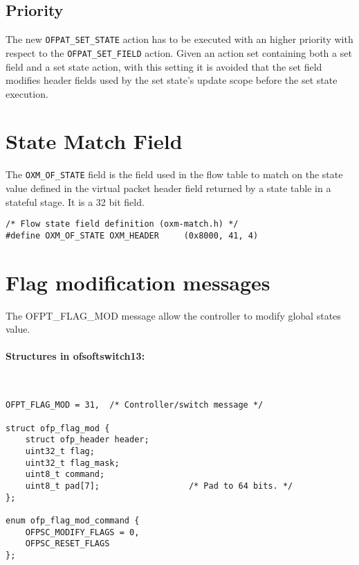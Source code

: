 \subsection{Priority}

The new \texttt{OFPAT\_SET\_STATE} action has to be executed with an higher priority with respect to the \texttt{OFPAT\_SET\_FIELD} action. Given an action set containing both a set field and a set state action, with this setting it is avoided that the set field modifies header fields used by the set state's update scope before the set state execution.


\section{State Match Field}
\label{sec:match_state}

The \texttt{OXM\_OF\_STATE} field is the field used in the flow table to match on the state value defined in the virtual packet header field returned by a state table in a stateful stage. It is a 32 bit field.


\begin{verbatim}
/* Flow state field definition (oxm-match.h) */
#define OXM_OF_STATE OXM_HEADER     (0x8000, 41, 4)
\end{verbatim}

\section{Flag modification messages}
\label{section:flag_mod_msg}
The OFPT\_FLAG\_MOD message allow the controller to modify global states value.
\paragraph{Structures in ofsoftswitch13:}\mbox{}\\
\begin{verbatim}
OFPT_FLAG_MOD = 31,  /* Controller/switch message */

struct ofp_flag_mod {
    struct ofp_header header;
    uint32_t flag;
    uint32_t flag_mask;
    uint8_t command;
    uint8_t pad[7];                  /* Pad to 64 bits. */
};

enum ofp_flag_mod_command { 
    OFPSC_MODIFY_FLAGS = 0,
    OFPSC_RESET_FLAGS
};

\end{verbatim}

